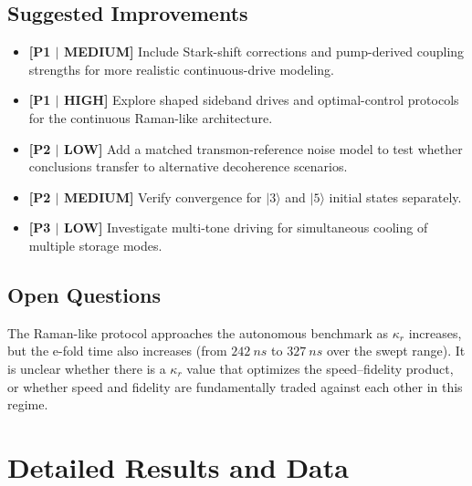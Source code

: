 \documentclass[aps,pra,twocolumn,reprint,floatfix,amsmath,amssymb]{revtex4-2}
\begin{document}
\subsection{Suggested Improvements}

\begin{itemize}
\item \textbf{[P1 $|$ MEDIUM]} Include Stark-shift corrections and pump-derived coupling strengths for more realistic continuous-drive modeling.
\item \textbf{[P1 $|$ HIGH]} Explore shaped sideband drives and optimal-control protocols for the continuous Raman-like architecture.
\item \textbf{[P2 $|$ LOW]} Add a matched transmon-reference noise model to test whether conclusions transfer to alternative decoherence scenarios.
\item \textbf{[P2 $|$ MEDIUM]} Verify convergence for $|3\rangle$ and $|5\rangle$ initial states separately.
\item \textbf{[P3 $|$ LOW]} Investigate multi-tone driving for simultaneous cooling of multiple storage modes.
\end{itemize}

\subsection{Open Questions}

The Raman-like protocol approaches the autonomous benchmark as $\kappa_r$ increases, but the e-fold time also increases (from $\SI{242}{ns}$ to $\SI{327}{ns}$ over the swept range).
It is unclear whether there is a $\kappa_r$ value that optimizes the speed--fidelity product, or whether speed and fidelity are fundamentally traded against each other in this regime.





\appendix

\section{Detailed Results and Data}
\label{app:detailed}
\end{document}
